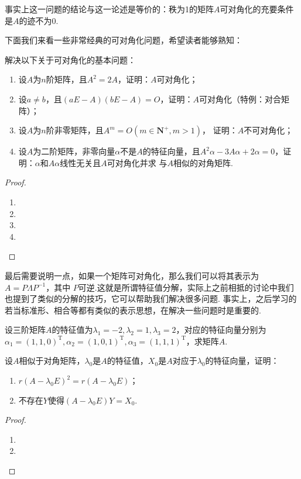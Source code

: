 事实上这一问题的结论与这一论述是等价的：秩为1的矩阵$A$可对角化的充要条件是$A$的迹不为0.

下面我们来看一些非常经典的可对角化问题，希望读者能够熟知：
\begin{example}
    解决以下关于可对角化的基本问题：
	\begin{enumerate}[label=(\arabic*)]
        \item 设$A$为$n$阶矩阵，且$A^2=2A$，证明：$A$可对角化；
        \item 设$a\neq b$，且$(aE-A)(bE-A)=O$，证明：$A$可对角化（特例：对合矩阵）；
        \item 设$A$为$n$阶非零矩阵，且$A^m=O(m\in\mathbf{N^+},m>1)$，
        证明：$A$不可对角化；
        \item 设$A$为二阶矩阵，非零向量$\alpha$不是$A$的特征向量，且$A^2\alpha-
        3A\alpha+2\alpha=0$，证明：$\alpha$和$A\alpha$线性无关且$A$可对角化并求
        与$A$相似的对角矩阵.
    \end{enumerate}
\end{example}
\begin{proof}
    \begin{enumerate}[label=(\arabic*)]
        \item 
        \item 
        \item 
        \item 
    \end{enumerate}
\end{proof}

最后需要说明一点，如果一个矩阵可对角化，那么我们可以将其表示为$A=P\Lambda P^{-1}$，其中
$P$可逆.这就是所谓特征值分解，实际上之前相抵的讨论中我们也提到了类似的分解的技巧，它可以帮助我们解决很多问题.
事实上，之后学习的若当标准形、相合等都有类似的表示思想，在解决一些问题时是重要的.
\begin{example}
    设三阶矩阵$A$的特征值为$\lambda_1=-2,\lambda_2=1,\lambda_3=2$，对应的特征向量分别为
    $\alpha_1=(1,1,0)^\mathrm{T},\alpha_2=(1,0,1)^\mathrm{T},\alpha_3=(1,1,1)^\mathrm{T}$，求矩阵$A$.
\end{example}
\begin{solution}

\end{solution}

\begin{example}
    设$A$相似于对角矩阵，$\lambda_0$是$A$的特征值，$X_0$是$A$对应于$\lambda_0$的特征向量，证明：
	\begin{enumerate}[label=(\arabic*)]
        \item $r(A-\lambda_0 E)^2=r(A-\lambda_0 E)$；
        \item 不存在$Y$使得$(A-\lambda_0 E)Y=X_0$.
    \end{enumerate}
\end{example}
\begin{proof}
    \begin{enumerate}[label=(\arabic*)]
        \item 
        \item 
    \end{enumerate}
\end{proof}

